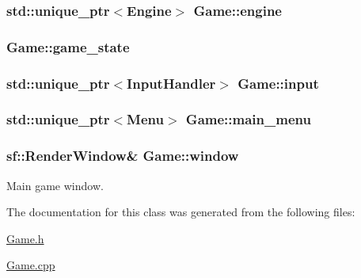 \subsubsection[{engine}]{\setlength{\rightskip}{0pt plus 5cm}std\+::unique\+\_\+ptr$<${\bf Engine}$>$ Game\+::engine}\label{class_game_aee6b9ebe224001f736e1ed71a3b28223}
\hypertarget{class_game_a12c5a68cb0b0f1ca4bd238824253db7c}{}
\subsubsection[{game\+\_\+state}]{ Game\+::game\+\_\+state\hspace{0.3cm}{\ttfamily [private]}}\label{class_game_a12c5a68cb0b0f1ca4bd238824253db7c}
\hypertarget{class_game_a737881663b793b4e7068d60a00937bba}{}
\subsubsection[{input}]{\setlength{\rightskip}{0pt plus 5cm}std\+::unique\+\_\+ptr$<${\bf Input\+Handler}$>$ Game\+::input\hspace{0.3cm}{\ttfamily [private]}}\label{class_game_a737881663b793b4e7068d60a00937bba}
\hypertarget{class_game_ae08cf171b4f973d47def68d69f561e2c}{}
\subsubsection[{main\+\_\+menu}]{\setlength{\rightskip}{0pt plus 5cm}std\+::unique\+\_\+ptr$<${\bf Menu}$>$ Game\+::main\+\_\+menu\hspace{0.3cm}{\ttfamily [private]}}\label{class_game_ae08cf171b4f973d47def68d69f561e2c}
\hypertarget{class_game_ad0fb4d8653dcf289fd6573cf5ba0f3d1}{}
\subsubsection[{window}]{\setlength{\rightskip}{0pt plus 5cm}sf\+::\+Render\+Window\& Game\+::window\hspace{0.3cm}{\ttfamily [private]}}\label{class_game_ad0fb4d8653dcf289fd6573cf5ba0f3d1}


Main game window. 



The documentation for this class was generated from the following files\+:\begin{DoxyCompactItemize}
\item 
\hyperlink{_game_8h}{Game.\+h}\item 
\hyperlink{_game_8cpp}{Game.\+cpp}\end{DoxyCompactItemize}

